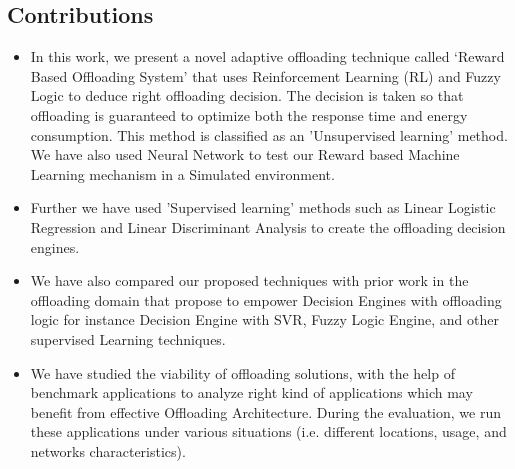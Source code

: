 \documentclass[12pt]{report}
\begin{document}
\subsection{Contributions}
\begin{itemize} 

\item In this work, we present a novel adaptive offloading technique called ‘Reward Based Offloading System’ that uses Reinforcement Learning (RL) and Fuzzy Logic to deduce right offloading decision. The decision is taken so that offloading is guaranteed to optimize both the response time and energy consumption. This method is classified as an 'Unsupervised learning' method. We have also used Neural Network to test our Reward based Machine Learning mechanism in a Simulated environment.
\item Further we have used 'Supervised learning' methods such as Linear Logistic Regression and Linear Discriminant Analysis to create the offloading decision engines. 
\item We have also compared our proposed techniques with prior work in the offloading domain that propose to empower Decision Engines with offloading logic for instance Decision Engine with SVR, Fuzzy Logic Engine, and other supervised Learning techniques.
\item We have studied the viability of offloading solutions, with the help of benchmark applications to analyze right kind of applications which may benefit from effective Offloading Architecture. During the evaluation, we run these applications under various situations (i.e. different locations, usage, and networks characteristics).


\end{itemize}
\end{document}

